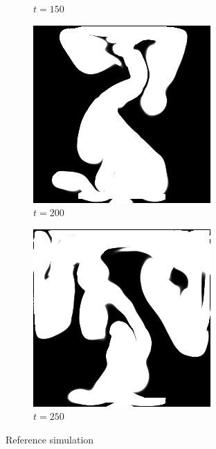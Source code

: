 \documentclass[a4paper,12pt,twoside]{report}
\begin{document}
\begin{figure}
\begin{subfigure}{0.18\textwidth}
  \caption{$t=150$}
\end{subfigure}
\begin{subfigure}{0.18\textwidth}
  \centering
  \includegraphics[scale=0.28]{buoyancy_test/dens_000200_ref.png}
  \caption{$t=200$}
\end{subfigure}
\begin{subfigure}{0.18\textwidth}
  \centering
  \includegraphics[scale=0.28]{buoyancy_test/dens_000249_ref.png}
  \caption{$t=250$}
\end{subfigure}
\caption{Reference simulation}
\end{figure}
\end{document}
